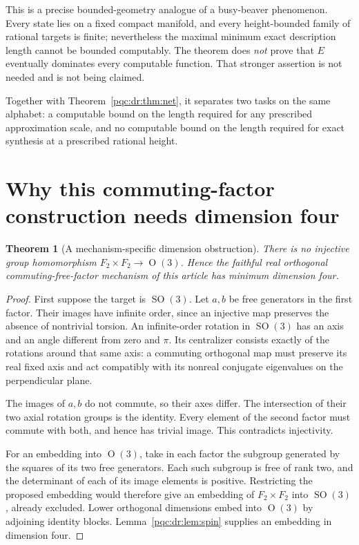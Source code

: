 \documentclass[11pt,letterpaper]{article}
\numberwithin{equation}{section}
\newtheorem{theorem}{Theorem}[section]
\theoremstyle{definition}
\theoremstyle{remark}
\newcommand{\srcmark}[1]{\par\noindent{\small\itshape [source~#1]}\par}
\newcommand{\SO}{\operatorname{SO}}
\newcommand{\OO}{\operatorname{O}}
\begin{document}
This is a precise bounded-geometry analogue of a busy-beaver phenomenon.
Every state lies on a fixed compact manifold, and every height-bounded
family of rational targets is finite; nevertheless the maximal minimum
exact description length cannot be bounded computably. The theorem does
\emph{not} prove that $E$ eventually dominates every computable function.
That stronger assertion is not needed and is not being claimed.

Together with Theorem~\ref{pqc:dr:thm:net}, it separates two tasks on the same
alphabet: a computable bound on the length required for any prescribed
approximation scale, and no computable bound on the length required for
exact synthesis at a prescribed rational height.
\section{Why this commuting-factor construction needs dimension four}
\label{pqc:dr:sec:dimension}
\srcmark{16}

\begin{theorem}[A mechanism-specific dimension obstruction]
\label{pqc:dr:thm:dimension}
There is no injective group homomorphism
$F_2\times F_2\to\OO(3)$. Hence the faithful real orthogonal
commuting-free-factor mechanism of this article has minimum dimension
four.
\end{theorem}
\begin{proof}
First suppose the target is $\SO(3)$. Let $a,b$ be free generators in
the first factor. Their images have infinite order, since an injective
map preserves the absence of nontrivial torsion. An infinite-order
rotation in $\SO(3)$ has an axis and an angle different from zero and
$\pi$. Its centralizer consists exactly of the rotations around that
same axis: a commuting orthogonal map must preserve its real fixed
axis and act compatibly with its nonreal conjugate eigenvalues on the
perpendicular plane.

The images of $a,b$ do not commute, so their axes differ. The intersection
of their two axial rotation groups is the identity. Every element of
the second factor must commute with both, and hence has trivial image.
This contradicts injectivity.

For an embedding into $\OO(3)$, take in each factor the subgroup generated
by the squares of its two free generators. Each such subgroup is free
of rank two, and the determinant of each of its image elements is
positive. Restricting the proposed embedding would therefore give an
embedding of $F_2\times F_2$ into $\SO(3)$, already excluded. Lower
orthogonal dimensions embed into $\OO(3)$ by adjoining identity blocks.
Lemma~\ref{pqc:dr:lem:spin} supplies an embedding in dimension four.
\end{proof}
\end{document}
